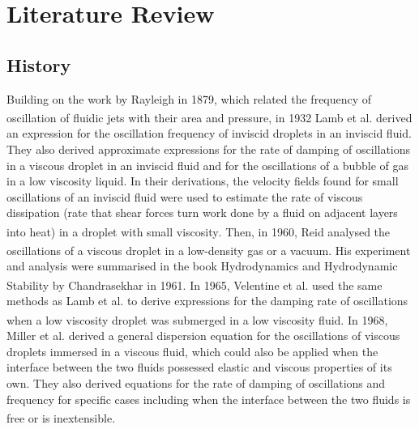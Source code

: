 \documentclass{physics_article_B}
\begin{document}


\section{Literature Review\label{sect:lit}}

\subsection{History}

 Building on the work by Rayleigh in 1879, which related the frequency of oscillation of fluidic jets with their area and pressure\textsuperscript{\cite{rayleigh}}, in 1932 Lamb et al. derived an expression for the oscillation frequency of inviscid droplets in an inviscid fluid. They also derived approximate expressions for the rate of damping of oscillations in a viscous droplet in an inviscid fluid and for the oscillations of a bubble of gas in a low viscosity liquid. In their derivations, the velocity fields found for small oscillations of an inviscid fluid were used to estimate the rate of viscous dissipation (rate that shear forces turn work done by a fluid on adjacent layers into heat) in a droplet with small viscosity\textsuperscript{\cite{lamb}}. Then, in 1960, Reid analysed the oscillations of a viscous droplet in a low-density gas or a vacuum\textsuperscript{\cite{reid}}. His experiment and analysis were summarised in the book Hydrodynamics and Hydrodynamic Stability by Chandrasekhar in 1961\textsuperscript{\cite{chandrasekhar}}. In 1965, Velentine et al. used the same methods as Lamb et al. to derive expressions for the damping rate of oscillations when a low viscosity droplet was submerged in a low viscosity fluid\textsuperscript{\cite{velentine}}. In 1968, Miller et al. derived a general dispersion equation for the oscillations of viscous droplets immersed in a viscous fluid, which could also be applied when the interface between the two fluids possessed elastic and viscous properties of its own. They also derived equations for the rate of damping of oscillations and frequency for specific cases including when the interface between the two fluids is free or is inextensible\textsuperscript{\cite{miller}}.
\end{document}
